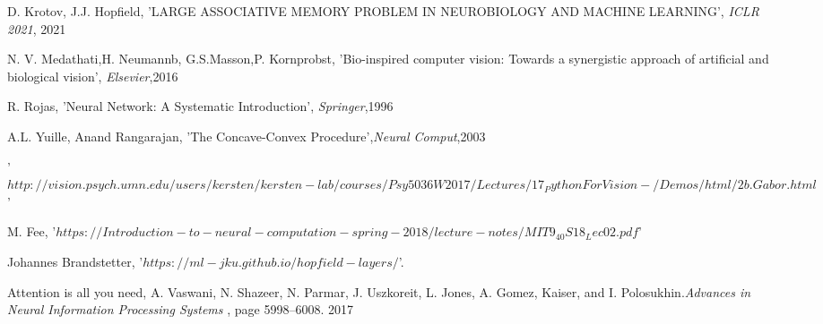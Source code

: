 \documentclass[journal]{IEEEtai}
\begin{document}
\begin{thebibliography}{34}
 D. Krotov, J.J. Hopfield, 'LARGE ASSOCIATIVE MEMORY PROBLEM IN NEUROBIOLOGY AND MACHINE LEARNING', {\em  ICLR 2021}, 2021


 N. V. Medathati,H. Neumannb, G.S.Masson,P. Kornprobst, 'Bio-inspired computer vision: Towards a synergistic approach of artificial and biological vision', {\em Elsevier},2016 

 R. Rojas, 'Neural Network: A Systematic Introduction', {\em Springer},1996

 A.L. Yuille, Anand Rangarajan, 'The Concave-Convex Procedure',{\em Neural Comput},2003





 '$http://vision.psych.umn.edu/users/kersten/kersten-lab/courses/Psy5036W2017/Lectures/17_PythonForVision-/Demos/html/2b.Gabor.html$'

 M. Fee, '$https://Introduction-to-neural-computation-spring-2018/lecture-notes/MIT9_40S18_Lec02.pdf$' 

 Johannes Brandstetter, '$https://ml-jku.github.io/hopfield-layers/$'.

	Attention is all you need,
A. Vaswani, N. Shazeer, N. Parmar, J. Uszkoreit, L. Jones, A. Gomez,  Kaiser, and I. Polosukhin.{\em Advances in Neural Information Processing Systems} , page 5998--6008. 2017

\end{thebibliography}
\
\end{document}
